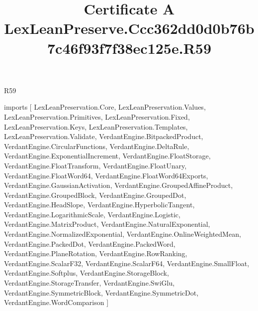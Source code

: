 \begin{lexlean}{R59}
\title{Certificate A LexLeanPreserve.Ccc362dd0d0b76b7c46f93f7f38ec125e.R59}
\begin{coremodule}
imports [
  LexLeanPreservation.Core,
  LexLeanPreservation.Values,
  LexLeanPreservation.Primitives,
  LexLeanPreservation.Fixed,
  LexLeanPreservation.Keys,
  LexLeanPreservation.Templates,
  LexLeanPreservation.Validate,
  VerdantEngine.BitpackedProduct,
  VerdantEngine.CircularFunctions,
  VerdantEngine.DeltaRule,
  VerdantEngine.ExponentialIncrement,
  VerdantEngine.FloatStorage,
  VerdantEngine.FloatTransform,
  VerdantEngine.FloatUnary,
  VerdantEngine.FloatWord64,
  VerdantEngine.FloatWord64Exports,
  VerdantEngine.GaussianActivation,
  VerdantEngine.GroupedAffineProduct,
  VerdantEngine.GroupedBlock,
  VerdantEngine.GroupedDot,
  VerdantEngine.HeadSlope,
  VerdantEngine.HyperbolicTangent,
  VerdantEngine.LogarithmicScale,
  VerdantEngine.Logistic,
  VerdantEngine.MatrixProduct,
  VerdantEngine.NaturalExponential,
  VerdantEngine.NormalizedExponential,
  VerdantEngine.OnlineWeightedMean,
  VerdantEngine.PackedDot,
  VerdantEngine.PackedWord,
  VerdantEngine.PlaneRotation,
  VerdantEngine.RowRanking,
  VerdantEngine.ScalarF32,
  VerdantEngine.ScalarF64,
  VerdantEngine.SmallFloat,
  VerdantEngine.Softplus,
  VerdantEngine.StorageBlock,
  VerdantEngine.StorageTransfer,
  VerdantEngine.SwiGlu,
  VerdantEngine.SymmetricBlock,
  VerdantEngine.SymmetricDot,
  VerdantEngine.WordComparison
]


\end{coremodule}
\end{lexlean}
